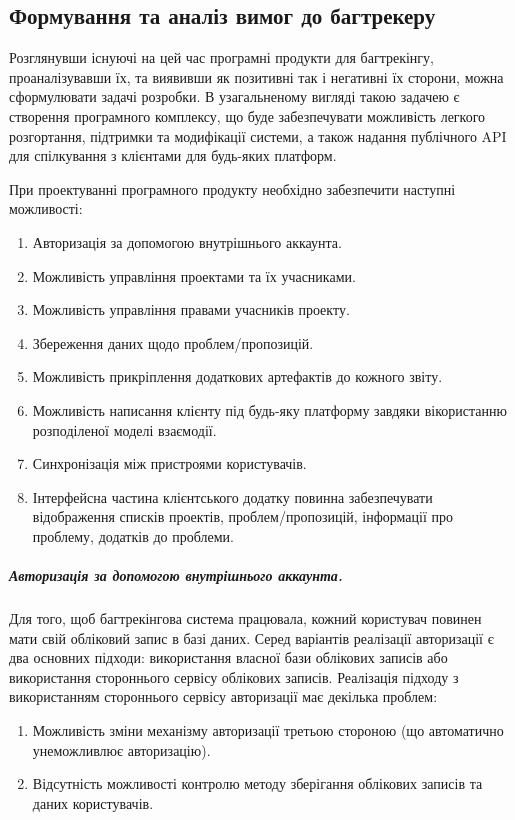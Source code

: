 \documentclass[../main.tex]{subfiles}
\begin{document}
	\subsection{Формування та аналіз вимог до багтрекеру}
	
		Розглянувши існуючі на цей час програмні продукти для багтрекінгу, проаналізувавши їх, та виявивши як позитивні так і негативні їх сторони, можна сформулювати задачі розробки. В узагальненому вигляді такою задачею є створення програмного комплексу, що буде забезпечувати можливість легкого розгортання, підтримки та модифікації системи, а також надання публічного API для спілкування з клієнтами для будь-яких платформ.
		
		При проектуванні програмного продукту необхідно забезпечити наступні можливості:
		\begin{enumerate}
		    \item Авторизація за допомогою внутрішнього аккаунта.
		    \item Можливість управління проектами та їх учасниками.
		    \item Можливість управління правами учасників проекту.
		    \item Збереження даних щодо проблем/пропозицій.
		    \item Можливість прикріплення додаткових артефактів до кожного звіту.
		    \item Можливість написання клієнту під будь-яку платформу завдяки вікористанню розподіленої моделі взаємодії.
		    \item Синхронізація між пристроями користувачів.
		    \item Інтерфейсна частина клієнтського додатку повинна забезпечувати відображення списків проектів, проблем/пропозицій, інформації про проблему, додатків до проблеми.
		\end{enumerate}
		
		\subparagraph{Авторизація за допомогою внутрішнього аккаунта.}
			Для того, щоб багтрекінгова система працювала, кожний користувач повинен мати свій обліковий запис в базі даних. Серед варіантів реалізації авторизації є два основних підходи: використання власної бази облікових записів або використання стороннього сервісу облікових записів. Реалізація підходу з використанням стороннього сервісу авторизації має декілька проблем:
			\begin{enumerate}
				\item Можливість зміни механізму авторизації третьою стороною (що автоматично унеможливлює авторизацію).
				\item Відсутність можливості контролю методу зберігання облікових записів та даних користувачів.
			\end{enumerate}
			
\end{document}
